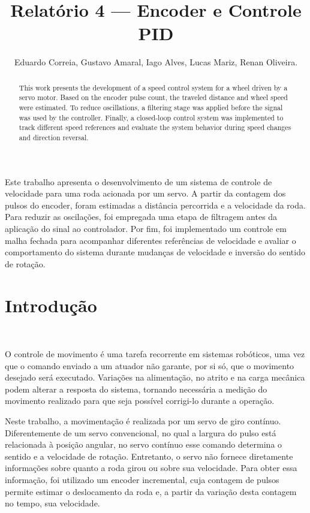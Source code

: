 \documentclass[12pt]{article}
\title{Relatório 4 --- Encoder e Controle PID}
\author{
  Eduardo Correia\inst{1},
  Gustavo Amaral\inst{1},
  Iago Alves\inst{1},
  Lucas Mariz\inst{1},
  Renan Oliveira\inst{1}.
}
\begin{document}
\maketitle

\begin{abstract}
This work presents the development of a speed control system for a wheel driven by a servo motor. Based on the encoder pulse count, the traveled distance and wheel speed were estimated. To reduce oscillations, a filtering stage was applied before the signal was used by the controller. Finally, a closed-loop control system was implemented to track different speed references and evaluate the system behavior during speed changes and direction reversal.
\end{abstract}

\begin{resumo}
Este trabalho apresenta o desenvolvimento de um sistema de controle de velocidade para uma roda acionada por um servo. A partir da contagem dos pulsos do encoder, foram estimadas a distância percorrida e a velocidade da roda. Para reduzir as oscilações, foi empregada uma etapa de filtragem antes da aplicação do sinal ao controlador. Por fim, foi implementado um controle em malha fechada para acompanhar diferentes referências de velocidade e avaliar o comportamento do sistema durante mudanças de velocidade e inversão do sentido de rotação.
\end{resumo}


\section{Introdução}\

O controle de movimento é uma tarefa recorrente em sistemas robóticos, uma vez que o comando enviado a um atuador não garante, por si só, que o movimento desejado será executado. Variações na alimentação, no atrito e na carga mecânica podem alterar a resposta do sistema, tornando necessária a medição do movimento realizado para que seja possível corrigi-lo durante a operação.

Neste trabalho, a movimentação é realizada por um servo de giro contínuo. Diferentemente de um servo convencional, no qual a largura do pulso está relacionada à posição angular, no servo contínuo esse comando determina o sentido e a velocidade de rotação. Entretanto, o servo não fornece diretamente informações sobre quanto a roda girou ou sobre sua velocidade. Para obter essa informação, foi utilizado um encoder incremental, cuja contagem de pulsos permite estimar o deslocamento da roda e, a partir da variação desta contagem no tempo, sua velocidade.
\end{document}
